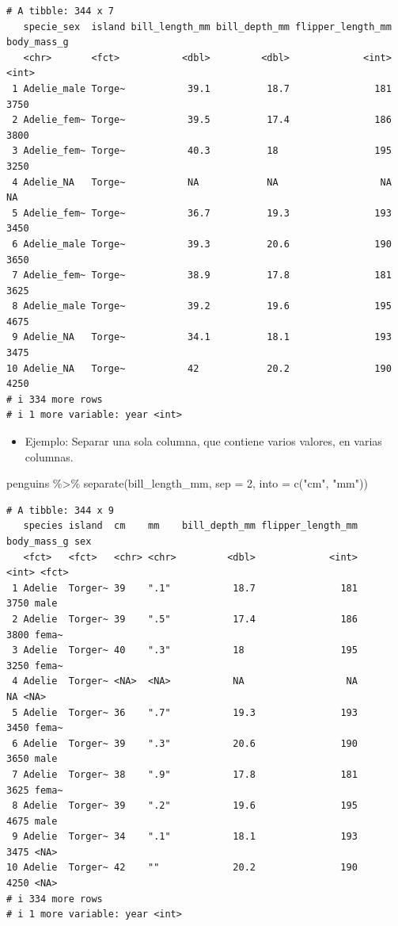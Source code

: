 \documentclass[
  letterpaper,
  DIV=11,
  numbers=noendperiod]{scrreprt}
\newenvironment{Shaded}{\begin{snugshade}}{\end{snugshade}}
\newcommand{\AttributeTok}[1]{\textcolor[rgb]{0.40,0.45,0.13}{#1}}
\newcommand{\DecValTok}[1]{\textcolor[rgb]{0.68,0.00,0.00}{#1}}
\newcommand{\FunctionTok}[1]{\textcolor[rgb]{0.28,0.35,0.67}{#1}}
\newcommand{\NormalTok}[1]{\textcolor[rgb]{0.00,0.23,0.31}{#1}}
\newcommand{\SpecialCharTok}[1]{\textcolor[rgb]{0.37,0.37,0.37}{#1}}
\newcommand{\StringTok}[1]{\textcolor[rgb]{0.13,0.47,0.30}{#1}}
\providecommand{\tightlist}{%
  \setlength{\itemsep}{0pt}\setlength{\parskip}{0pt}}\usepackage{longtable,booktabs,array}
\begin{document}
\begin{verbatim}
# A tibble: 344 x 7
   specie_sex  island bill_length_mm bill_depth_mm flipper_length_mm body_mass_g
   <chr>       <fct>           <dbl>         <dbl>             <int>       <int>
 1 Adelie_male Torge~           39.1          18.7               181        3750
 2 Adelie_fem~ Torge~           39.5          17.4               186        3800
 3 Adelie_fem~ Torge~           40.3          18                 195        3250
 4 Adelie_NA   Torge~           NA            NA                  NA          NA
 5 Adelie_fem~ Torge~           36.7          19.3               193        3450
 6 Adelie_male Torge~           39.3          20.6               190        3650
 7 Adelie_fem~ Torge~           38.9          17.8               181        3625
 8 Adelie_male Torge~           39.2          19.6               195        4675
 9 Adelie_NA   Torge~           34.1          18.1               193        3475
10 Adelie_NA   Torge~           42            20.2               190        4250
# i 334 more rows
# i 1 more variable: year <int>
\end{verbatim}

\begin{itemize}
\tightlist
\item
  {Ejemplo}: Separar una sola columna, que contiene varios valores, en
  varias columnas.
\end{itemize}

\begin{Shaded}
\begin{Highlighting}[]
\NormalTok{penguins }\SpecialCharTok{\%\textgreater{}\%} \FunctionTok{separate}\NormalTok{(bill\_length\_mm, }\AttributeTok{sep =} \DecValTok{2}\NormalTok{, }\AttributeTok{into =} \FunctionTok{c}\NormalTok{(}\StringTok{"cm"}\NormalTok{, }\StringTok{"mm"}\NormalTok{))}
\end{Highlighting}
\end{Shaded}

\begin{verbatim}
# A tibble: 344 x 9
   species island  cm    mm    bill_depth_mm flipper_length_mm body_mass_g sex  
   <fct>   <fct>   <chr> <chr>         <dbl>             <int>       <int> <fct>
 1 Adelie  Torger~ 39    ".1"           18.7               181        3750 male 
 2 Adelie  Torger~ 39    ".5"           17.4               186        3800 fema~
 3 Adelie  Torger~ 40    ".3"           18                 195        3250 fema~
 4 Adelie  Torger~ <NA>  <NA>           NA                  NA          NA <NA> 
 5 Adelie  Torger~ 36    ".7"           19.3               193        3450 fema~
 6 Adelie  Torger~ 39    ".3"           20.6               190        3650 male 
 7 Adelie  Torger~ 38    ".9"           17.8               181        3625 fema~
 8 Adelie  Torger~ 39    ".2"           19.6               195        4675 male 
 9 Adelie  Torger~ 34    ".1"           18.1               193        3475 <NA> 
10 Adelie  Torger~ 42    ""             20.2               190        4250 <NA> 
# i 334 more rows
# i 1 more variable: year <int>
\end{verbatim}
\end{document}

